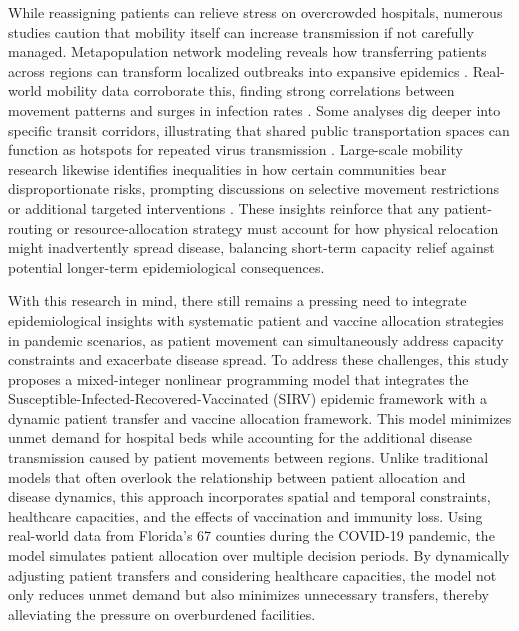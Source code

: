 \documentclass{article}
\begin{document}
While reassigning patients can relieve stress on overcrowded hospitals, numerous studies caution that mobility itself can increase transmission if not carefully managed. Metapopulation network modeling reveals how transferring patients across regions can transform localized outbreaks into expansive epidemics \parencite{calvetti2021modeling}. Real-world mobility data corroborate this, finding strong correlations between movement patterns and surges in infection rates \parencite{badr2020association}. Some analyses dig deeper into specific transit corridors, illustrating that shared public transportation spaces can function as hotspots for repeated virus transmission \parencite{mo2021modeling}. Large-scale mobility research likewise identifies inequalities in how certain communities bear disproportionate risks, prompting discussions on selective movement restrictions or additional targeted interventions \parencite{chang2021mobility, chang2021supporting}. These insights reinforce that any patient-routing or resource-allocation strategy must account for how physical relocation might inadvertently spread disease, balancing short-term capacity relief against potential longer-term epidemiological consequences.

With this research in mind, there still remains a pressing need to integrate epidemiological insights with systematic patient and vaccine allocation strategies in pandemic scenarios, as patient movement can simultaneously address capacity constraints and exacerbate disease spread. To address these challenges, this study proposes a mixed-integer nonlinear programming model that integrates the Susceptible-Infected-Recovered-Vaccinated (SIRV) epidemic framework with a dynamic patient transfer and vaccine allocation framework. This model minimizes unmet demand for hospital beds while accounting for the additional disease transmission caused by patient movements between regions. Unlike traditional models that often overlook the relationship between patient allocation and disease dynamics, this approach incorporates spatial and temporal constraints, healthcare capacities, and the effects of vaccination and immunity loss. Using real-world data from Florida's 67 counties during the COVID-19 pandemic, the model simulates patient allocation over multiple decision periods. By dynamically adjusting patient transfers and considering healthcare capacities, the model not only reduces unmet demand but also minimizes unnecessary transfers, thereby alleviating the pressure on overburdened facilities. 
\end{document}
